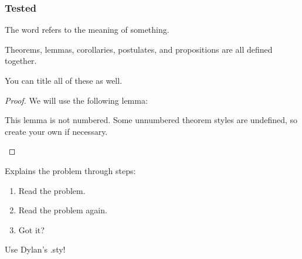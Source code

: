 \documentclass[twoside]{article}
\begin{document}
\subsubsection{Tested}
\begin{defn}[Definition]
The word  refers to the meaning of something.
\end{defn}
\begin{theorem}
Theorems, lemmas, corollaries, postulates, and propositions are all defined together. 
\end{theorem}
\begin{lemma}
You can title all of these as well.
\end{lemma}
\begin{corollary}

\end{corollary}
\begin{postulate}

\end{postulate}
\begin{prop}

\end{prop}
\begin{proof}
We will use the following lemma:
\begin{lemma*}
This lemma is not numbered. Some unnumbered theorem styles are undefined, so create your own if necessary.
\end{lemma*}
\end{proof}
\begin{example}

\end{example}
\begin{soln}

\end{soln}
\begin{problem}

\end{problem}
\begin{walk}
Explains the problem through steps:
\begin{enumerate}
    \item Read the problem.
    \item Read the problem again.
    \item Got it?
\end{enumerate}
\end{walk}

\begin{moral}
Use Dylan's .sty!
\end{moral}
\end{document}
